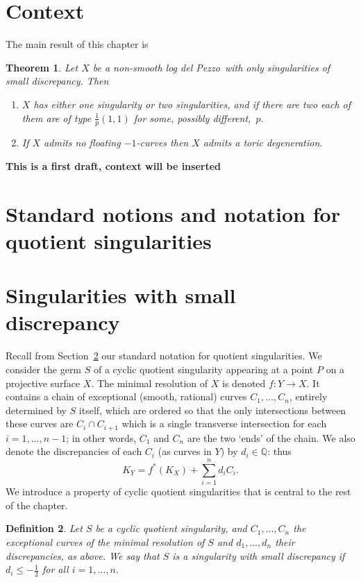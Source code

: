 \documentclass[12pt]{amsbook}
\theoremstyle{plain}
\newtheorem{thm}{Theorem}[section]
\newtheorem{dfn}[thm]{Definition}
\newcommand{\ldp}{log del Pezzo}
\newcommand{\Q}{\mathbb{Q}}
\begin{document}
 

\setcounter{chapter}{2}

\section{Context}
The main result of this chapter is 
\begin{thm}\label{ThmOnSing}
Let $X$ be a non-smooth \ldp\ with only singularities of small discrepancy. Then 
\begin{enumerate}
\item\label{thm38i}
$X$ has either one singularity or two singularities, and if there are two each of them are of type $\frac{1}p(1,1)$ for some, possibly different,~$p$.
\item\label{thm38ii}
If $X$ admits no floating $-1$-curves then $X$ admits a toric degeneration. %
\end{enumerate}
\end{thm}
\textbf{This is a first draft, context will be inserted}

\section{Standard notions and notation for quotient singularities}
\label{sec!notation}

\section{Singularities with small discrepancy}

Recall from Section~\ref{sec!notation} our standard notation for quotient singularities.
We consider the germ $S$ of a cyclic quotient singularity appearing at a point $P$ on a 
projective surface $X$.
The minimal resolution of $X$ is denoted $f\colon Y \longrightarrow X$. It contains a chain of
exceptional (smooth, rational)
curves $C_1,\dots,C_n$, entirely determined by $S$ itself, which are ordered so
that the only intersections between these curves are
$C_i\cap C_{i+1}$ which is a single transverse intersection for each $i=1,\dots,n-1$; 
in other words,
$C_1$ and $C_n$ are the two `ends' of the chain.
We also denote the discrepancies of each $C_i$ (as curves in $Y$) by $d_i\in\Q$: thus
\[
K_Y = f^*(K_X) + \sum_{i=1}^n d_i C_i.
\]
We introduce a property of cyclic quotient singularities that is central to the rest of the chapter.
\begin{dfn}
Let $S$ be a cyclic quotient singularity, and $C_1, \dots ,C_n$ the exceptional curves of the minimal resolution of $S$ and $d_1, \dots,d_n$ their discrepancies, as above.
We say that $S$ is a \emph{singularity with small discrepancy} if $d_i \leq -\frac{1}{2}$ for
all $i=1,\dots,n$.
\end{dfn}
\end{document}
